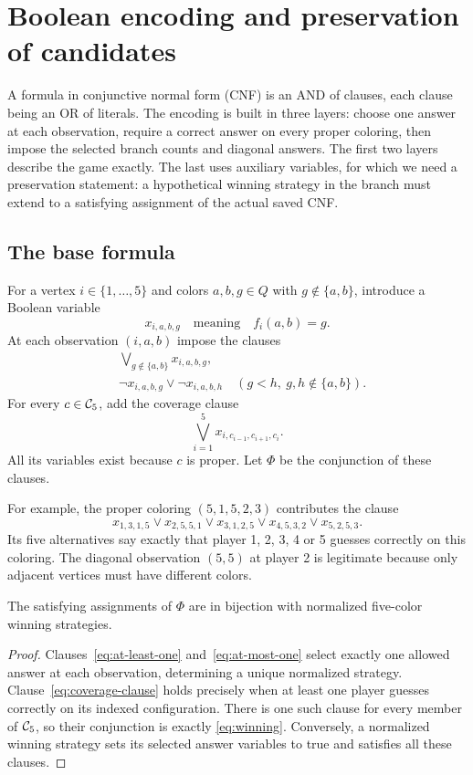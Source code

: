 \section{Boolean encoding and preservation of candidates}\label{sec:encoding}
A formula in conjunctive normal form (CNF) is an AND of clauses, each
clause being an OR of literals. The encoding is built in three layers:
choose one answer at each observation, require a correct answer on every
proper coloring, then impose the selected branch counts and diagonal
answers. The first two layers describe the game exactly. The last uses
auxiliary variables, for which we need a preservation statement: a
hypothetical winning strategy in the branch must extend to a satisfying
assignment of the actual saved CNF.
\subsection{The base formula}
For a vertex $i\in\{1,\ldots,5\}$ and colors $a,b,g\in Q$ with
$g\notin\{a,b\}$,
introduce a Boolean variable
\[
x_{i,a,b,g}\quad\text{meaning}\quad f_i(a,b)=g.
\]
At each observation $(i,a,b)$ impose the clauses
\begin{align}
&\bigvee_{g\notin\{a,b\}}x_{i,a,b,g},\label{eq:at-least-one}\\
&\neg x_{i,a,b,g}\lor\neg x_{i,a,b,h}
\quad(g<h,\ g,h\notin\{a,b\}).\label{eq:at-most-one}
\end{align}
For every $c\in\mathcal{C}_5$, add the coverage clause
\begin{equation}\label{eq:coverage-clause}
\bigvee_{i=1}^5x_{i,c_{i-1},c_{i+1},c_i}.
\end{equation}
All its variables exist because $c$ is proper. Let $\Phi$ be the
conjunction of these clauses.

For example, the proper coloring $(5,1,5,2,3)$ contributes the clause
\[
x_{1,3,1,5}\lor x_{2,5,5,1}\lor x_{3,1,2,5}
\lor x_{4,5,3,2}\lor x_{5,2,5,3}.
\]
Its five alternatives say exactly that player 1, 2, 3, 4 or 5 guesses
correctly on this coloring. The diagonal observation $(5,5)$ at player 2
is legitimate because only adjacent vertices must have different colors.

\begin{lemma}\label{lem:base}
The satisfying assignments of $\Phi$ are in bijection with normalized
five-color winning strategies.
\end{lemma}
\begin{proof}
Clauses~\eqref{eq:at-least-one} and~\eqref{eq:at-most-one} select exactly
one allowed answer at each observation, determining a unique normalized
strategy. Clause~\eqref{eq:coverage-clause} holds precisely when at least
one player guesses correctly on its indexed configuration. There is one
such clause for every member of $\mathcal{C}_5$, so their conjunction is exactly
\eqref{eq:winning}. Conversely, a normalized winning strategy sets its
selected answer variables to true and satisfies all these clauses.
\end{proof}

